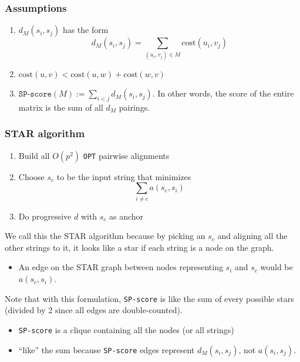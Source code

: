 \documentclass[10pt]{article}
\begin{document}
\subsubsection*{Assumptions}
\begin{enumerate}
	\item $d_M(s_i, s_j)$ has the form
	\[d_M(s_i, s_j) = \sum_{(u_i, v_j) \in M} \text{cost}(u_i, v_j)\]
    \item $\text{cost}(u, v) < \text{cost}(u, w) + \text{cost}(w, v)$
    \item $\texttt{SP-score}(M) := \sum_{i < j} d_M(s_i, s_j)$.  In other words, the score of the entire matrix is the sum of all $d_M$ pairings.
\end{enumerate}

\subsubsection*{STAR algorithm}
\begin{enumerate}
	\item Build all $O(p^2)$ \texttt{OPT} pairwise alignments
	\item Choose $s_c$ to be the input string that minimizes
	\[\sum_{i \neq c} a(s_c, s_i)\]
    \item Do progressive $d$ with $s_c$ as anchor
\end{enumerate}
We call this the STAR algorithm because by picking an $s_c$ and aligning all the other strings to it, it looks like a star if each string is a node on the graph.
\begin{itemize}
	\item An edge on the STAR graph between nodes representing $s_i$ and $s_c$ would be $a(s_c, s_i)$.
\end{itemize}
Note that with this formulation, \texttt{SP-score} is like the sum of every possible stars (divided by 2 since all edges are double-counted).
\begin{itemize}
    \item \texttt{SP-score} is a clique containing all the nodes (or all strings)
	\item ``like'' the sum because \texttt{SP-score} edges represent $d_M(s_i, s_j)$, not $a(s_i, s_j)$.
\end{itemize}
\end{document}
